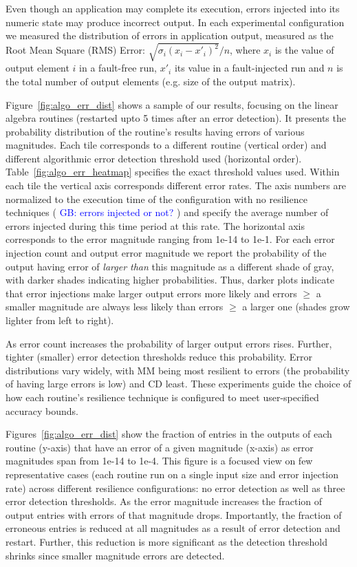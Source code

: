 \documentclass[10pt, conference, compsocconf]{IEEEtran}
\newcommand{\greg}[1]{%
  \textcolor{blue}{GB: #1}
}
\begin{document}
Even though an application may complete its execution, errors injected into its numeric state may produce incorrect output.
In each experimental configuration we measured the distribution of errors in application output, measured as the Root Mean Square (RMS) Error: $\sqrt{\sigma_i (x_i-x'_i)^2}/n$, where $x_i$ is the value of output element $i$ in a fault-free run, $x'_i$ its value in a fault-injected run and $n$ is the total number of output elements (e.g. size of the output matrix).

Figure~\ref{fig:algo_err_dist} shows a sample of our results, focusing on the linear algebra routines (restarted upto 5 times after an error detection).
It presents the probability distribution of the routine's results having errors of various magnitudes.
Each tile corresponds to a different routine (vertical order) and different algorithmic error detection threshold used (horizontal order).
Table~\ref{fig:algo_err_heatmap} specifies the exact threshold values used.
Within each tile the vertical axis corresponds different error rates.
The axis numbers are normalized to the execution time of the configuration with no resilience techniques (\greg{errors injected or not?}) and specify the average number of errors injected during this time period at this rate.
The horizontal axis corresponds to the error magnitude ranging from 1e-14 to 1e-1.
For each error injection count and output error magnitude we report the probability of the output having error of \emph{larger than} this magnitude as a different shade of gray, with darker shades indicating higher probabilities.
Thus, darker plots indicate that error injections make larger output errors more likely and errors $\ge$ a smaller magnitude are always less likely than errors $\ge$ a larger one (shades grow lighter from left to right).

As error count increases the probability of larger output errors rises.
Further, tighter (smaller) error detection thresholds reduce this probability.
Error distributions vary widely, with MM being most resilient to errors (the probability of having large errors is low) and CD least.
These experiments guide the choice of how each routine's resilience technique is configured to meet user-specified accuracy bounds.

Figures~\ref{fig:algo_err_dist} show the fraction of entries in the outputs of each routine (y-axis) that have an error of a given magnitude (x-axis) as error magnitudes span from 1e-14 to 1e-4.
This figure is a focused view on few representative cases (each routine run on a single input size and error injection rate) across different resilience configurations: no error detection as well as three error detection thresholds.
As the error magnitude increases the fraction of output entries with errors of that magnitude drops.
Importantly, the fraction of erroneous entries is reduced at all magnitudes as a result of error detection and restart.
Further, this reduction is more significant as the detection threshold shrinks since smaller magnitude errors are detected.
\end{document}

